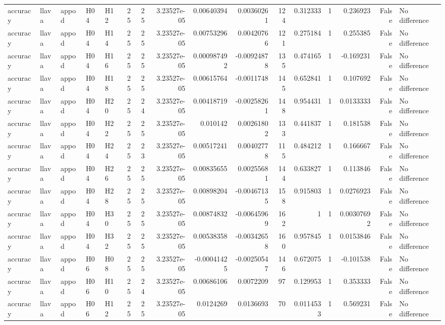 \begin{longtable}{lllllrrrrrrrrrrl}
accuracy & llava & appod & H04 & H12 & 25 & 25 & 3.23527e-05 & 0.00640394 & 0.00360261 & 124 & 0.312333 & 1 & 0.236923 & False & No difference \\
accuracy & llava & appod & H04 & H14 & 25 & 25 & 3.23527e-05 & 0.00753296 & 0.00420766 & 121 & 0.275184 & 1 & 0.255385 & False & No difference \\
accuracy & llava & appod & H04 & H16 & 25 & 25 & 3.23527e-05 & 0.000987492 & -0.00924878 & 135 & 0.474165 & 1 & -0.169231 & False & No difference \\
accuracy & llava & appod & H04 & H18 & 25 & 25 & 3.23527e-05 & 0.00615764 & -0.0011748 & 145 & 0.652841 & 1 & 0.107692 & False & No difference \\
accuracy & llava & appod & H04 & H20 & 25 & 24 & 3.23527e-05 & 0.00418719 & -0.00258261 & 148 & 0.954431 & 1 & 0.0133333 & False & No difference \\
accuracy & llava & appod & H04 & H22 & 25 & 25 & 3.23527e-05 & 0.010142 & 0.00261802 & 133 & 0.441837 & 1 & 0.181538 & False & No difference \\
accuracy & llava & appod & H04 & H24 & 25 & 23 & 3.23527e-05 & 0.00517241 & 0.00402778 & 115 & 0.484212 & 1 & 0.166667 & False & No difference \\
accuracy & llava & appod & H04 & H26 & 25 & 25 & 3.23527e-05 & 0.00835655 & 0.00255681 & 144 & 0.633827 & 1 & 0.113846 & False & No difference \\
accuracy & llava & appod & H04 & H28 & 25 & 25 & 3.23527e-05 & 0.00898204 & -0.00467135 & 158 & 0.915803 & 1 & 0.0276923 & False & No difference \\
accuracy & llava & appod & H04 & H30 & 25 & 25 & 3.23527e-05 & 0.00874832 & -0.00645969 & 162 & 1 & 1 & 0.00307692 & False & No difference \\
accuracy & llava & appod & H04 & H32 & 25 & 25 & 3.23527e-05 & 0.00538358 & -0.00342658 & 160 & 0.957845 & 1 & 0.0153846 & False & No difference \\
accuracy & llava & appod & H06 & H08 & 25 & 25 & 3.23527e-05 & -0.00041425 & -0.00250547 & 146 & 0.672075 & 1 & -0.101538 & False & No difference \\
accuracy & llava & appod & H06 & H10 & 25 & 24 & 3.23527e-05 & 0.00686106 & 0.0072209 & 97 & 0.129953 & 1 & 0.353333 & False & No difference \\
accuracy & llava & appod & H06 & H12 & 25 & 25 & 3.23527e-05 & 0.0124269 & 0.0136693 & 70 & 0.0114533 & 1 & 0.569231 & False & No difference \\

\end{longtable}
